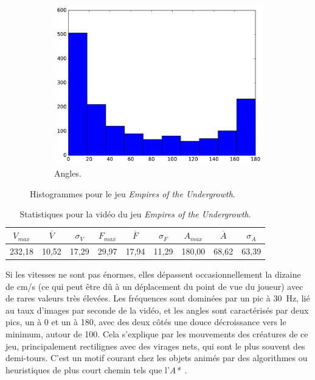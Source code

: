 \begin{figure}[!htbp]
\begin{subfigure}[t]{\subImgWclicks}
			\includegraphics[width=\textwidth]{figures/ch3/spider_angle}
			\caption{Angles.}
			\label{fig:spider_angle}
		\end{subfigure}
		\caption[Histogrammes pour le jeu \emph{Empires of the Undergrowth}]{Histogrammes pour le jeu \emph{Empires of the Undergrowth}.}
		\label{fig:histSpider}
	\end{figure}

\begin{table}
	\centering
	\begin{tabular}{c c c c c c c c c}
		$V_{max}$	& $\overline{V}$	& $\sigma_{V}$	& $F_{max}$	& $\overline{F}$	& $\sigma_{F}$	& $A_{max}$	& $\overline{A}$	& $\sigma_{A}$	\bigstrut[b] \\ \hline

		232,18		& 10,52				& 17,29			& 29,97		& 17,94				& 11,29			& 180,00	& 68,62				& 63,39			\bigstrut[t] \\
	\end{tabular}
	\caption[Statistiques pour la vidéo du jeu \emph{Empires of the Undergrowth}]{Statistiques pour la vidéo du jeu \emph{Empires of the Undergrowth}.}
	\label{tab:spider_stats}
\end{table}

	Si les vitesses ne sont pas énormes, elles dépassent occasionnellement la dizaine de cm/s (ce qui peut être dû à un déplacement du point de vue du joueur) avec de rares valeurs très élevées. Les fréquences sont dominées par un pic à 30~Hz, lié au taux d'images par seconde de la vidéo, et les angles sont caractérisés par deux pics, un à 0\textdegree{} et un à 180\textdegree{}, avec des deux côtés une douce décroissance vers le minimum, autour de 100\textdegree{}. Cela s'explique par les mouvements des créatures de ce jeu, principalement rectilignes avec des virages nets, qui sont le plus souvent des demi-tours. C'est un motif courant chez les objets animés par des algorithmes ou heuristiques de plus court chemin tels que l'\emph{A*}~\cite{dijkstra1959note, hart1968formal}.
	
